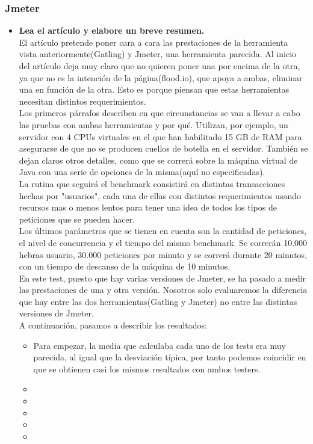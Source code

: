 \subsubsection{Jmeter}
\begin{itemize}
	\item \textbf{Lea el artículo y elabore un breve resumen\cite{benchmarkingJmGt}.}\\
	El artículo pretende poner cara a cara las prestaciones de la herramienta vista anteriormente(Gatling) y Jmeter, una herramienta parecida. Al inicio del artículo deja muy claro que no quieren poner una por encima de la otra, ya que no es la intención de la página(flood.io), que apoya a ambas, eliminar una en función de la otra. Esto es porque piensan que estas herramientas necesitan distintos requerimientos.\\
	
	Los primeros párrafos describen en que circunstancias se van a llevar a cabo las pruebas con ambas herramientas y por qué. Utilizan, por ejemplo, un servidor con 4 CPUs virtuales en el que han habilitado 15 GB de RAM para asegurarse de que no se producen cuellos de botella en el servidor. También se dejan claros otros detalles, como que se correrá sobre la máquina virtual de Java con una serie de opciones de la misma(aquí no especificadas).\\
	
	La rutina que seguirá el benchmark consistirá en distintas transacciones hechas por "usuarios", cada una de ellas con distintos requerimientos usando recursos mas o menos lentos para tener una idea de todos los tipos de peticiones que se pueden hacer. \\
	
	Los últimos parámetros que se tienen en cuenta son la cantidad de peticiones, el nivel de concurrencia y el tiempo del mismo benchmark. Se correrán 10.000 hebras usuario, 30.000 peticiones por minuto y se correrá durante 20 minutos, con un tiempo de descanso de la máquina de 10 minutos.\\
	
	En este test, puesto que hay varias versiones de Jmeter, se ha pasado a medir las prestaciones de una y otra versión. Nosotros solo evaluaremos la diferencia que hay entre las dos herramientas(Gatling y Jmeter) no entre las distintas versiones de Jmeter.\\
	
	A continuación, pasamos a describir los resultados:\\
	
	\begin{itemize}
		\item Para empezar, la media que calculaba cada uno de los tests era muy parecida, al igual que la desviación típica, por tanto podemos coincidir en que se obtienen casi los mismos resultados con ambos testers.
		\item
		\item
		\item
		\item
		\item
	\end{itemize}
	
	 
\end{itemize}
